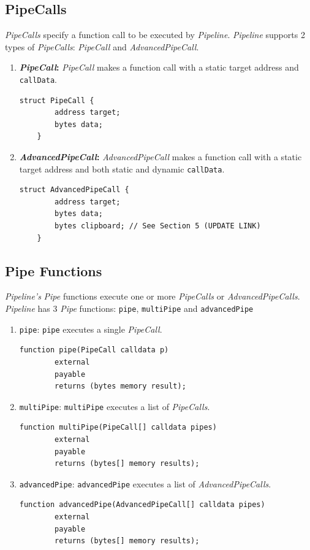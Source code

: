 \documentclass[tikz]{article}
\newcommand{\code}[1]{\texttt{#1}}
\newcommand{\term}[1]{\textsl{#1}}
\begin{document}
\newpage
\subsection{PipeCalls}
\term{PipeCalls} specify a function call to be executed by \term{Pipeline}. \term{Pipeline} supports 2 types of \term{PipeCalls}: \term{PipeCall} and \term{AdvancedPipeCall}.

\begin{enumerate}
    \item \textbf{\term{PipeCall}:} \term{PipeCall} makes a function call with a static target address and \code{callData}.
    \begin{lstlisting}[language=Solidity]
    struct PipeCall {
        address target;
        bytes data;
    }
    \end{lstlisting}

    \item \textbf{\term{AdvancedPipeCall}:} \term{AdvancedPipeCall} makes a function call with a static target address and both static and dynamic \code{callData}.
    \begin{lstlisting}[language=Solidity]
    struct AdvancedPipeCall {
        address target;
        bytes data;
        bytes clipboard; // See Section 5 (UPDATE LINK)
    }
    \end{lstlisting}

\end{enumerate}

\subsection{Pipe Functions}
\term{Pipeline's} \term{Pipe} functions execute one or more \term{PipeCalls} or \term{AdvancedPipeCalls}. \term{Pipeline} has 3 \term{Pipe} functions: \code{pipe}, \code{multiPipe} and \code{advancedPipe}

\begin{enumerate}
    \item \code{pipe}: \code{pipe} executes a single \term{PipeCall}.
    \begin{lstlisting}[language=Solidity]
    function pipe(PipeCall calldata p)
        external
        payable
        returns (bytes memory result);
    \end{lstlisting}
    \item \code{multiPipe}: \code{multiPipe} executes a list of \term{PipeCalls}.
    \begin{lstlisting}[language=Solidity]
    function multiPipe(PipeCall[] calldata pipes)
        external
        payable
        returns (bytes[] memory results);
    \end{lstlisting}
    \item \code{advancedPipe}: \code{advancedPipe} executes a list of \term{AdvancedPipeCalls}.
    \begin{lstlisting}[language=Solidity]
    function advancedPipe(AdvancedPipeCall[] calldata pipes)
        external
        payable
        returns (bytes[] memory results);
    \end{lstlisting}
\end{enumerate}
\end{document}
